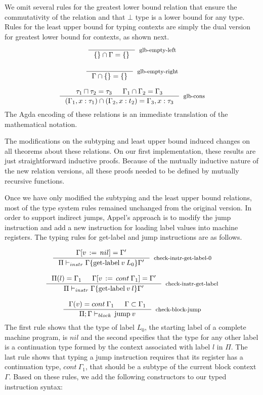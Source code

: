\documentclass[review]{elsarticle}
\theoremstyle{definition}
\begin{document}
We omit several rules for the greatest lower bound relation that ensure the commutativity of the
relation and that $\bot$ type is a lower bound for any type. Rules for the least upper bound for
typing contexts are simply the dual version for greatest lower bound for contexts, as shown next.
\[
  \begin{array}{c}
    \inference{}{\{\} \cap \Gamma = \{\}}[glb-empty-left] \\ \\
    \inference{}{\Gamma \cap \{\} = \{\}}[glb-empty-right] \\ \\
    \inference{\tau_1 \sqcap \tau_2 = \tau_3 & \Gamma_1 \cap \Gamma_2 = \Gamma_3}
              {(\Gamma_1 , x : \tau_1) \cap (\Gamma_2 , x : t_2) = \Gamma_3, x : \tau_3}
              [glb-cons]
  \end{array}
\]
The Agda encoding of these relations is an immediate translation of the mathematical notation.

The modifications on the subtyping and least upper bound induced changes on all theorems
about these relations. On our first implementation, these results are just straightforward
inductive proofs. Because of the mutually inductive nature of the new relation versions, all
these proofs needed to be defined by mutually recursive functions.

Once we have only modified the subtyping and the least upper bound relations, most of the type system
rules remained unchanged from the original version. In order to support indirect jumps, Appel's
approach is to modify the jump instruction and add a new instruction for loading label values into
machine registers. The typing rules for get-label and jump instructions are as follows.

\[
\begin{array}{c}
  \inference{\Gamma[v\,:=\,nil] = \Gamma'}
            {\Pi\vdash_{instr} \Gamma \{\textrm{get-label}\:v\:L_0\}\Gamma'}
            [check-instr-get-label-0] \\ \\
  \inference{\Pi(l) = \Gamma_1 & \Gamma[v\,:=\,cont\:\Gamma_1] = \Gamma'}
            {\Pi\vdash_{instr} \Gamma \{\textrm{get-label}\:v\:l\}\Gamma'}
            [check-instr-get-label]\\ \\
  \inference{\Gamma(v) = cont\:\Gamma_1 & \Gamma \subset \Gamma_1}
            {\Pi;\Gamma\vdash_{block}\,\textrm{jump}\:v}
            [check-block-jump]
\end{array}
\]
The first rule shows that the type of label $L_0$, the starting label of a complete machine program,
is $nil$ and the second specifies that the type for any other label is a continuation type formed by
the context associated with label $l$ in $\Pi$. The last rule shows that typing a jump instruction
requires that its register has a continuation type, $cont\:\Gamma_1$, that should be a subtype of
the current block context $\Gamma$. Based on these rules, we add the following constructors to our
typed instruction syntax:
\end{document}
